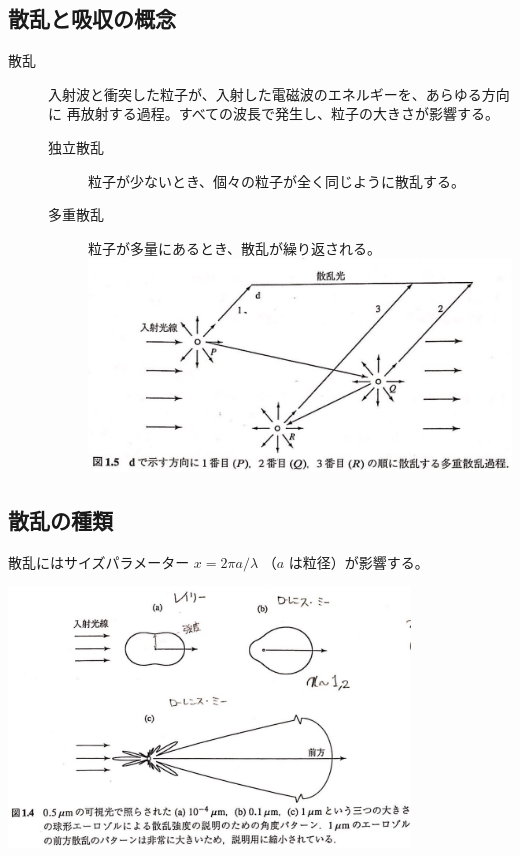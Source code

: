 \documentclass[article,nontitlepage,]{dennou777}
\newcommand{\centeralign}[1]{\rule{0pt}{0pt}\hfill#1\hfill\rule{0pt}{0pt}}
\begin{document}
\subsection{散乱と吸収の概念}
\begin{description}
	\item[散乱] 入射波と衝突した粒子が、入射した電磁波のエネルギーを、あらゆる方向に
		再放射する過程。すべての波長で発生し、粒子の大きさが影響する。
		\begin{description}
			\item[独立散乱] 粒子が少ないとき、個々の粒子が全く同じように散乱する。
			\item[多重散乱] 粒子が多量にあるとき、散乱が繰り返される。\\
				\includegraphics[width=\linewidth]{mscatter.jpg}
		\end{description}
\end{description}

\subsection{散乱の種類}
散乱にはサイズパラメーター $x=2\pi a/\lambda$ （$a$ は粒径）が影響する。

\centeralign{\includegraphics[width=0.8\textwidth]{scatter.jpg}}
\end{document}
